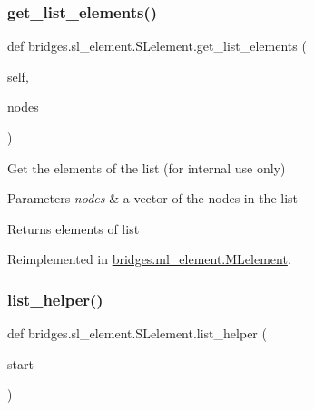 \mbox{\label{classbridges_1_1sl__element_1_1_s_lelement_ad3b94c8e7540aca841e6306c190e1be1}} 
\subsubsection{\texorpdfstring{get\_list\_elements()}{get\_list\_elements()}}
{\footnotesize\ttfamily def bridges.\+sl\+\_\+element.\+S\+Lelement.\+get\+\_\+list\+\_\+elements (\begin{DoxyParamCaption}\item[{}]{self,  }\item[{}]{nodes }\end{DoxyParamCaption})}



Get the elements of the list (for internal use only) 


\begin{DoxyParams}{Parameters}
{\em nodes} & a vector of the nodes in the list \\
\hline
\end{DoxyParams}
\begin{DoxyReturn}{Returns}
elements of list 
\end{DoxyReturn}


Reimplemented in \mbox{\hyperlink{classbridges_1_1ml__element_1_1_m_lelement_a3996cd2cec7c3978437392eba2ef66eb}{bridges.\+ml\+\_\+element.\+M\+Lelement}}.

\mbox{\label{classbridges_1_1sl__element_1_1_s_lelement_a7aaed085f18082fab6d027ca014130ca}} 
\subsubsection{\texorpdfstring{list\_helper()}{list\_helper()}}
{\footnotesize\ttfamily def bridges.\+sl\+\_\+element.\+S\+Lelement.\+list\+\_\+helper (\begin{DoxyParamCaption}\item[{}]{start }\end{DoxyParamCaption})}

